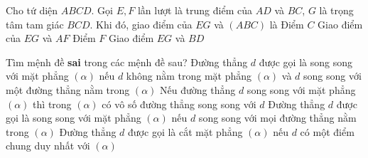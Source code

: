 \begin{ex}%
Cho tứ diện $ABCD$. Gọi $E, F$ lần lượt là trung điểm của $AD$ và $BC$, $G$ là trọng tâm tam giác $BCD$. Khi đó, giao điểm của $EG$ và $(ABC)$ là
\choice
{Điểm $C$}
{\True Giao điểm của $EG$ và $AF$}
{Điểm $F$}
{Giao điểm $EG$ và $BD$}

\end{ex}

\begin{ex}%
Tìm mệnh đề \textbf{sai} trong các mệnh đề sau?
\choice
{Đường thẳng $d$ được gọi là song song với mặt phẳng $(\alpha)$ nếu $d$ không nằm trong mặt phẳng $(\alpha)$ và $d$ song song với một đường thẳng nằm trong $(\alpha)$}
{Nếu đường thẳng $d$ song song với mặt phẳng $(\alpha)$ thì trong $(\alpha)$ có vô số đường thẳng song song với $d$}
{\True Đường thẳng $d$ được gọi là song song với mặt phẳng $(\alpha)$ nếu $d$ song song với mọi đường thẳng nằm trong $(\alpha)$}
{Đường thẳng $d$ được gọi là cắt mặt phẳng $(\alpha)$ nếu $d$ có một điểm chung duy nhất với $(\alpha)$}
\end{ex}

